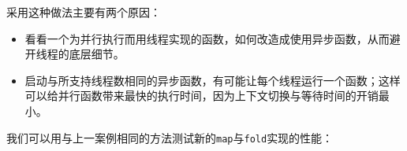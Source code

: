 
采用这种做法主要有两个原因：



\begin{itemize}
\item 看看一个为并行执行而用线程实现的函数，如何改造成使用异步函数，从而避开线程的底层细节。



\item 启动与所支持线程数相同的异步函数，有可能让每个线程运行一个函数；这样可以给并行函数带来最快的执行时间，因为上下文切换与等待时间的开销最小。

\end{itemize}



我们可以用与上一案例相同的方法测试新的\texttt{map}与\texttt{fold}实现的性能：



